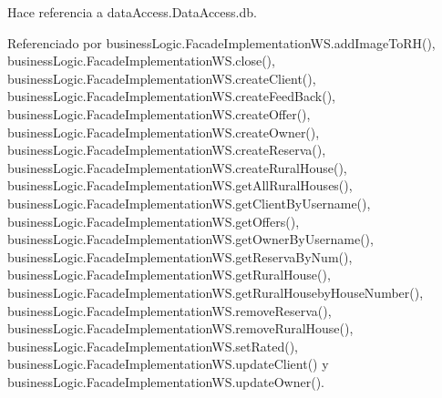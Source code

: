 \begin{DoxyCode}{0}

\end{DoxyCode}


Hace referencia a data\+Access.\+Data\+Access.\+db.



Referenciado por business\+Logic.\+Facade\+Implementation\+W\+S.\+add\+Image\+To\+R\+H(), business\+Logic.\+Facade\+Implementation\+W\+S.\+close(), business\+Logic.\+Facade\+Implementation\+W\+S.\+create\+Client(), business\+Logic.\+Facade\+Implementation\+W\+S.\+create\+Feed\+Back(), business\+Logic.\+Facade\+Implementation\+W\+S.\+create\+Offer(), business\+Logic.\+Facade\+Implementation\+W\+S.\+create\+Owner(), business\+Logic.\+Facade\+Implementation\+W\+S.\+create\+Reserva(), business\+Logic.\+Facade\+Implementation\+W\+S.\+create\+Rural\+House(), business\+Logic.\+Facade\+Implementation\+W\+S.\+get\+All\+Rural\+Houses(), business\+Logic.\+Facade\+Implementation\+W\+S.\+get\+Client\+By\+Username(), business\+Logic.\+Facade\+Implementation\+W\+S.\+get\+Offers(), business\+Logic.\+Facade\+Implementation\+W\+S.\+get\+Owner\+By\+Username(), business\+Logic.\+Facade\+Implementation\+W\+S.\+get\+Reserva\+By\+Num(), business\+Logic.\+Facade\+Implementation\+W\+S.\+get\+Rural\+House(), business\+Logic.\+Facade\+Implementation\+W\+S.\+get\+Rural\+Houseby\+House\+Number(), business\+Logic.\+Facade\+Implementation\+W\+S.\+remove\+Reserva(), business\+Logic.\+Facade\+Implementation\+W\+S.\+remove\+Rural\+House(), business\+Logic.\+Facade\+Implementation\+W\+S.\+set\+Rated(), business\+Logic.\+Facade\+Implementation\+W\+S.\+update\+Client() y business\+Logic.\+Facade\+Implementation\+W\+S.\+update\+Owner().

\mbox{\label{classdata_access_1_1_data_access_a660f0677b4ead89efe35c8f8f13c48ec}} 
